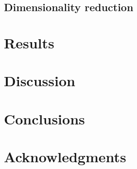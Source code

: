 \documentclass[reprint,aps,prd,superscriptaddress,showkeys,showpacs]{revtex4-1}
\begin{document}
\subsection{Dimensionality reduction}


\section{Results}


\section{Discussion}


\section{Conclusions}


\section*{Acknowledgments}




\label{lastpage}
\end{document}
